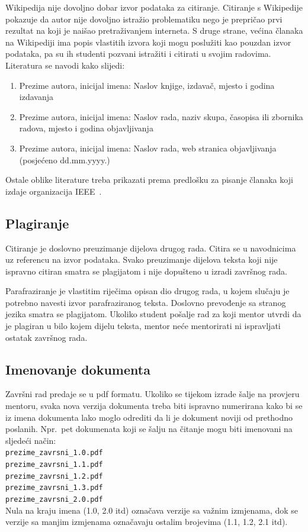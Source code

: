 Wikipedija nije dovoljno dobar izvor podataka za citiranje. Citiranje s Wikipedije pokazuje da autor nije dovoljno istražio problematiku nego je prepričao prvi rezultat na koji je naišao pretraživanjem interneta. S druge strane, većina članaka na Wikipediji ima popis vlastitih izvora koji mogu poslužiti kao pouzdan izvor podataka, pa su ih studenti pozvani istražiti i citirati u svojim radovima. %
Literatura se navodi kako slijedi:
\begin{enumerate}
\item 
Prezime autora, inicijal imena: Naslov knjige, izdavač, mjesto i godina izdavanja
\item Prezime autora, inicijal imena: Naslov rada, naziv skupa, časopisa ili zbornika radova,
mjesto i godina objavljivanja
\item Prezime autora, inicijal imena: Naslov rada, web stranica objavljivanja (posjećeno dd.mm.yyyy.)
\end{enumerate}
Ostale oblike literature treba prikazati prema predlošku za pisanje članaka koji izdaje organizacija IEEE~\cite{IEEE}.


\subsection{Plagiranje}
Citiranje je doslovno preuzimanje dijelova drugog rada. Citira se u navodnicima uz referencu na izvor podataka. 
Svako preuzimanje dijelova teksta koji nije ispravno citiran smatra se plagijatom i nije dopušteno u izradi završnog rada.

Parafraziranje je vlastitim riječima opisan dio drugog rada, u kojem slučaju je potrebno navesti izvor 
parafraziranog teksta. Doslovno prevođenje sa stranog jezika smatra se plagijatom. Ukoliko student pošalje rad za koji mentor utvrdi da je plagiran u bilo kojem dijelu teksta, mentor neće mentorirati ni ispravljati ostatak završnog rada.

\subsection{Imenovanje dokumenta}
Završni rad predaje se u pdf formatu. Ukoliko se tijekom izrade šalje na provjeru mentoru, svaka nova verzija dokumenta treba biti 
ispravno numerirana kako bi se iz imena 
dokumenta lako moglo odrediti da li je dokument noviji od prethodno poslanih. Npr.~pet dokumenata koji se šalju na čitanje mogu biti 
imenovani na sljedeći način:
\\
\texttt{prezime\_zavrsni\_1.0.pdf}\\
\texttt{prezime\_zavrsni\_1.1.pdf}\\
\texttt{prezime\_zavrsni\_1.2.pdf}\\
\texttt{prezime\_zavrsni\_1.3.pdf}\\
\texttt{prezime\_zavrsni\_2.0.pdf}\\
Nula na kraju imena (1.0, 2.0 itd) označava verzije sa važnim izmjenama, dok se verzije sa manjim izmjenama označavaju ostalim brojevima (1.1, 1.2, 2.1 itd). 

